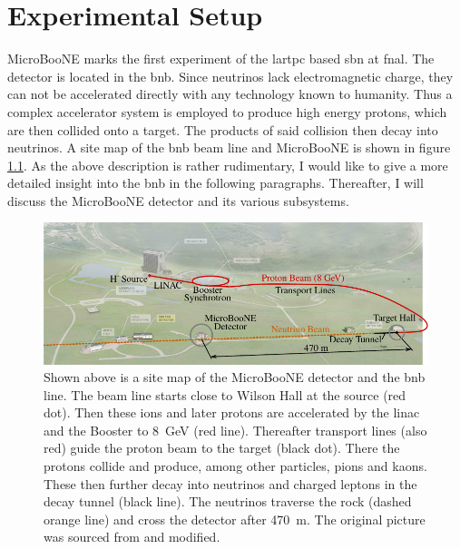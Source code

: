 \chapter{Experimental Setup} %
MicroBooNE marks the first experiment of the \gls{lartpc} based \gls{sbn} at \gls{fnal}. The detector is located in the \gls{bnb}. Since neutrinos lack electromagnetic charge, they can not be accelerated directly with any technology known to humanity. Thus a complex accelerator system is employed to produce high energy protons, which are then collided onto a target. The products of said collision then decay \ia into neutrinos. A site map of the \gls{bnb} beam line and MicroBooNE is shown in figure \ref{fig:MicroBooNELocation}. As the above description is rather rudimentary, I would like to give a more detailed insight into the \gls{bnb} in the following paragraphs. Thereafter, I will discuss the MicroBooNE detector and its various subsystems.
\begin{figure}[htbp]
    \centering
    \includegraphics[width=1.0\textwidth]{images/MicroBooNE/MicroBooNELocation.pdf}
    \caption[Site map of the MicroBooNE Detector and the Booster Neutrino Beam Line]{Shown above is a site map of the MicroBooNE detector and the \gls{bnb} line. The beam line starts close to Wilson Hall at the  source (red dot). Then these ions and later protons are accelerated by the \gls{linac} and the Booster to \SI{8}{\giga\electronvolt} (red line). Thereafter transport lines (also red) guide the proton beam to the target (black dot). There the protons collide and produce, among other particles, pions and kaons. These then further decay into neutrinos and charged leptons in the decay tunnel (black line). The neutrinos traverse the rock (dashed orange line) and cross the detector after \SI{470}{\metre}. The original picture was sourced from \cite{MicroBooNEDetector} and modified.}
    \label{fig:MicroBooNELocation}
\end{figure}

